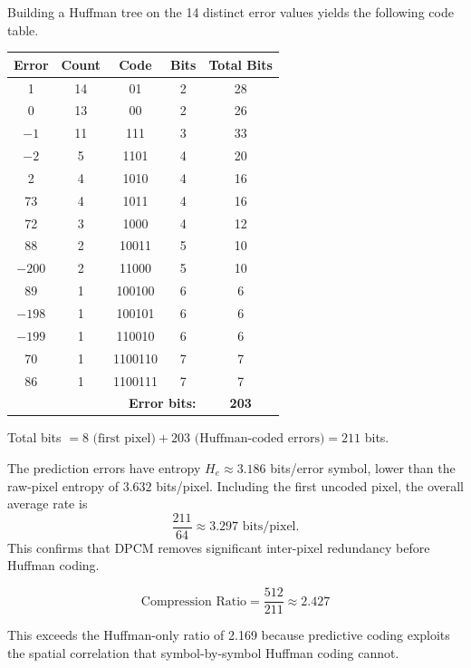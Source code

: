 \documentclass[12pt]{article}
\begin{document}
\begin{stepbox}
Building a Huffman tree on the 14 distinct error values yields the following code table.

\begin{center}
\renewcommand{\arraystretch}{1.15}
\begin{tabular}{|c|c|c|c|c|}
\hline
\textbf{Error} & \textbf{Count} & \textbf{Code} & \textbf{Bits} & \textbf{Total Bits} \\
\hline
1    & 14 & 01      & 2 & 28 \\
0    & 13 & 00      & 2 & 26 \\
$-1$ & 11 & 111     & 3 & 33 \\
$-2$ & 5  & 1101    & 4 & 20 \\
2    & 4  & 1010    & 4 & 16 \\
73   & 4  & 1011    & 4 & 16 \\
72   & 3  & 1000    & 4 & 12 \\
88   & 2  & 10011   & 5 & 10 \\
$-200$& 2 & 11000   & 5 & 10 \\
89   & 1  & 100100  & 6 & 6  \\
$-198$& 1 & 100101  & 6 & 6  \\
$-199$& 1 & 110010  & 6 & 6  \\
70   & 1  & 1100110 & 7 & 7  \\
86   & 1  & 1100111 & 7 & 7  \\
\hline
\multicolumn{4}{|r|}{\textbf{Error bits:}} & \textbf{203} \\
\hline
\end{tabular}
\end{center}

Total bits $= 8 \text{ (first pixel)} + 203 \text{ (Huffman-coded errors)} = 211$ bits.
\end{stepbox}

\begin{resultsbox}
The prediction errors have entropy $H_e \approx 3.186$ bits/error symbol, lower than the raw-pixel entropy of $3.632$ bits/pixel. Including the first uncoded pixel, the overall average rate is
\[
\frac{211}{64} \approx 3.297 \text{ bits/pixel}.
\]
This confirms that DPCM removes significant inter-pixel redundancy before Huffman coding.

\[
\boxed{\text{Compression Ratio} = \frac{512}{211} \approx 2.427}
\]

This exceeds the Huffman-only ratio of 2.169 because predictive coding exploits the spatial correlation that symbol-by-symbol Huffman coding cannot.
\end{resultsbox}
\end{document}
